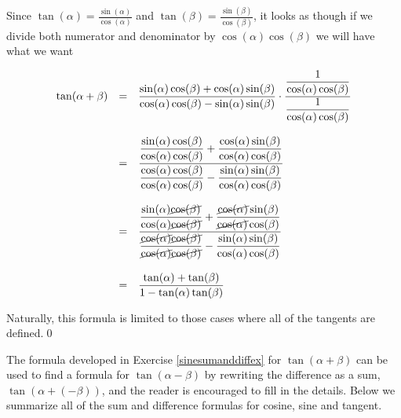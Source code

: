 \begin{ex}
\begin{enumerate}
Since  $\tan(\alpha) = \frac{\sin(\alpha)}{\cos(\alpha)}$ and $\tan(\beta) = \frac{\sin(\beta)}{\cos(\beta)}$, it looks as though if we divide both numerator and denominator by $\cos(\alpha) \cos(\beta)$ we will have what we want

\vspace{-.1in}

\[ \begin{array}{rcl}

\tan(\alpha + \beta) & = & \dfrac{\sin(\alpha) \cos(\beta) + \cos(\alpha) \sin(\beta)}{\cos(\alpha) \cos(\beta) - \sin(\alpha) \sin(\beta)} \cdot\dfrac{\dfrac{1}{\cos(\alpha) \cos(\beta)}}{\dfrac{1}{\cos(\alpha) \cos(\beta)}}\\
                    &   & \\
 										& = & \dfrac{\dfrac{\sin(\alpha) \cos(\beta)}{\cos(\alpha) \cos(\beta)} + \dfrac{\cos(\alpha) \sin(\beta)}{\cos(\alpha) \cos(\beta)}}{\dfrac{\cos(\alpha) \cos(\beta)}{\cos(\alpha) \cos(\beta)} - \dfrac{\sin(\alpha) \sin(\beta)}{\cos(\alpha) \cos(\beta)}}\\
                    &   & \\
										& = & \dfrac{\dfrac{\sin(\alpha) \cancel{\cos(\beta)}}{\cos(\alpha) \cancel{\cos(\beta)}} + \dfrac{\cancel{\cos(\alpha)} \sin(\beta)}{\cancel{\cos(\alpha)} \cos(\beta)}}{\dfrac{\cancel{\cos(\alpha)} \cancel{\cos(\beta)}}{\cancel{\cos(\alpha)} \cancel{\cos(\beta)}} - \dfrac{\sin(\alpha) \sin(\beta)}{\cos(\alpha) \cos(\beta)}}\\
                    &   & \\
										& = & \dfrac{\tan(\alpha) + \tan(\beta)}{1 -\tan(\alpha) \tan(\beta)}\\
\end{array} \]

Naturally, this formula is limited to those cases where all of the tangents are defined.\qed

\end{enumerate}

\end{ex}

The formula developed in Exercise \ref{sinesumanddiffex} for $\tan(\alpha + \beta)$ can be used to find a formula for $\tan(\alpha - \beta)$ by rewriting the difference as a sum, $\tan(\alpha + (-\beta))$, and the reader is encouraged to fill in the details.  Below we summarize all of the sum and difference formulas for cosine, sine and tangent.

\smallskip

